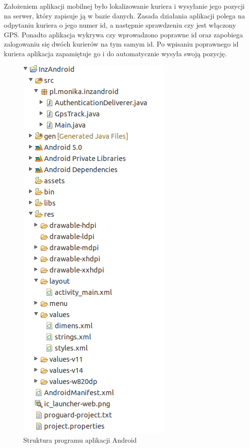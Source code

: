 \documentclass[eng,printmode,oneside]{mgr}
\begin{document}
Założeniem aplikacji mobilnej było lokalizowanie kuriera i wysyłanie jego
pozycji na serwer, który zapisuje ją w bazie danych. Zasada działania aplikacji
polega na odpytaniu kuriera o jego numer id, a następnie sprawdzeniu czy jest
włączony GPS. Ponadto aplikacja wykrywa czy wprowadzono poprawne id oraz
zapobiega zalogowaniu się dwóch kurierów na tym samym id. Po wpisaniu poprawnego
id kuriera aplikacja zapamiętuje go i do automatycznie wysyła swoją pozycję.

\begin{figure}
\centering
\captionsetup{justification=centering,margin=0cm}
\begin{center}
\includegraphics[width=.3\textwidth]{struktura_android.png}
\end{center}
\caption{Struktura programu aplikacji Android}
\label{fig:androidStruktura}
\end{figure}
\end{document}
